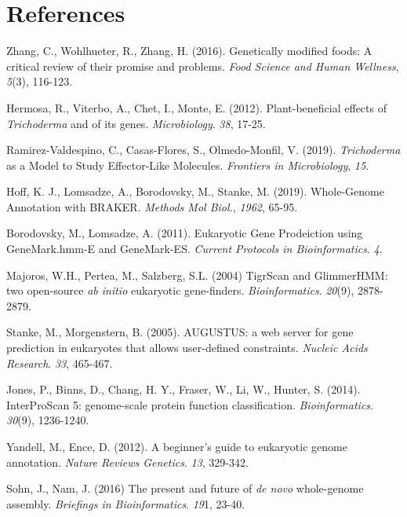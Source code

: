 \documentclass[12pt]{article}
\begin{document}
\section{References}

\begin{thebibliography}{99}
 Zhang, C., Wohlhueter, R., Zhang, H. (2016). Genetically
  modified foods: A critical review of their promise and
  problems. \textit{Food Science and Human Wellness}, \textit{5}(3),
  116-123.

 Hermosa, R., Viterbo, A., Chet, I., Monte,
  E. (2012). Plant-beneficial effects of \textit{Trichoderma} and of
  its genes. \textit{Microbiology}. \textit{38},
  17-25. 

 Ramirez-Valdespino, C., Casas-Flores, S.,
  Olmedo-Monfil, V. (2019). \textit{Trichoderma} as a Model to Study
  Effector-Like Molecules. \textit{Frontiers in Microbiology}, \textit{15}.

 Hoff, K. J., Lomsadze, A., Borodovsky, M., 
  Stanke, M. (2019). Whole-Genome Annotation with
  BRAKER. \textit{Methods Mol Biol.}, \textit{1962}, 65-95.

 Borodovsky, M., Lomsadze, A. (2011). Eukaryotic
  Gene Prodeiction using GeneMark.hmm-E and
  GeneMark-ES. \textit{Current Protocols in
    Bioinformatics}. \textit{4}.

 Majoros, W.H., Pertea, M., Salzberg, S.L. (2004) TigrScan and
  GlimmerHMM: two open-source \textit{ab initio} eukaryotic
  gene-finders. \textit{Bioinformatics}. \textit{20}(9), 2878-2879.
  
 Stanke, M., Morgenstern, B. (2005). AUGUSTUS: a web
  server for gene prediction in eukaryotes that allows user-defined
  constraints. \textit{Nucleic Acids Research}. \textit{33}, 465-467.
  
 Jones, P., Binns, D., Chang, H. Y., Fraser,
  W., Li, W., Hunter, S. (2014). InterProScan 5: genome-scale
  protein function
  classification. \textit{Bioinformatics}. \textit{30}(9),
  1236-1240.

 Yandell, M., Ence, D. (2012). A beginner's
  guide to eukaryotic genome annotation. \textit{Nature Reviews
    Genetics}. \textit{13}, 329-342.
  
 Sohn, J., Nam, J. (2016) The present and future of
  \textit{de novo} whole-genome assembly. \textit{Briefings in
    Bioinformatics}. \textit{19}1, 23-40.


\end{thebibliography}
\end{document}
